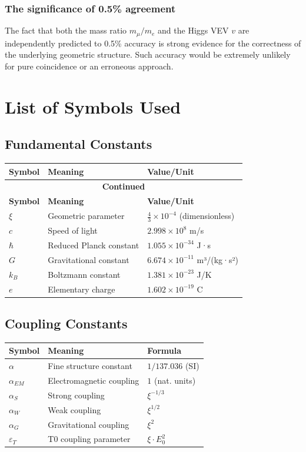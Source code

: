\subsubsection{The significance of 0.5\% agreement}

The fact that both the mass ratio $m_\mu/m_e$ and the Higgs VEV $v$ are independently predicted to 0.5\% accuracy is strong evidence for the correctness of the underlying geometric structure. Such accuracy would be extremely unlikely for pure coincidence or an erroneous approach.

\section{List of Symbols Used}
\label{app:symbols_en}

\subsection{Fundamental Constants}
\begin{longtable}{lll}
	\toprule
	\textbf{Symbol} & \textbf{Meaning} & \textbf{Value/Unit} \\
	\midrule
	\endfirsthead
	\multicolumn{3}{c}{{\bfseries Continued}} \\
	\toprule
	\textbf{Symbol} & \textbf{Meaning} & \textbf{Value/Unit} \\
	\midrule
	\endhead
	\bottomrule
	\endfoot
	\bottomrule
	\endlastfoot
	
	$\xi$ & Geometric parameter & $\frac{4}{3} \times 10^{-4}$ (dimensionless) \\
	$c$ & Speed of light & $2.998 \times 10^8$ m/s \\
	$\hbar$ & Reduced Planck constant & $1.055 \times 10^{-34}$ J·s \\
	$G$ & Gravitational constant & $6.674 \times 10^{-11}$ m³/(kg·s²) \\
	$k_B$ & Boltzmann constant & $1.381 \times 10^{-23}$ J/K \\
	$e$ & Elementary charge & $1.602 \times 10^{-19}$ C \\
\end{longtable}
\normalsize

\subsection{Coupling Constants}
\begin{longtable}{lll}
	\toprule
	\textbf{Symbol} & \textbf{Meaning} & \textbf{Formula} \\
	\midrule
	$\alpha$ & Fine structure constant & $1/137.036$ (SI) \\
	$\alpha_{EM}$ & Electromagnetic coupling & $1$ (nat. units) \\
	$\alpha_S$ & Strong coupling & $\xi^{-1/3}$ \\
	$\alpha_W$ & Weak coupling & $\xi^{1/2}$ \\
	$\alpha_G$ & Gravitational coupling & $\xi^{2}$ \\
	$\varepsilon_T$ & T0 coupling parameter & $\xi \cdot E_0^2$ \\
	\bottomrule
\end{longtable}
\normalsize

